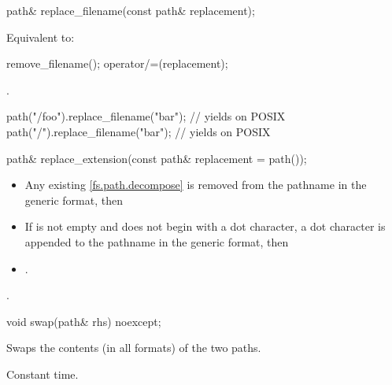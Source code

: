 %
\begin{itemdecl}
path& replace_filename(const path& replacement);
\end{itemdecl}

\begin{itemdescr}
\pnum
\effects
Equivalent to:
\begin{codeblock}
remove_filename();
operator/=(replacement);
\end{codeblock}

\pnum
\returns
{}.

\pnum
\begin{example}
\begin{codeblock}
path("/foo").replace_filename("bar");   // yields  on POSIX
path("/").replace_filename("bar");      // yields  on POSIX
\end{codeblock}
\end{example}
\end{itemdescr}

%
\begin{itemdecl}
path& replace_extension(const path& replacement = path());
\end{itemdecl}

\begin{itemdescr}
\pnum
\effects
  \begin{itemize}
\item Any existing \ref{fs.path.decompose}\tcode{)} is removed from the
    pathname in the generic format,
    then
\item If  is not empty and does not begin with a dot
    character, a dot character is appended to the pathname in the generic format, then
\item
  .
  \end{itemize}

\pnum
\returns
{}.
\end{itemdescr}

%
\begin{itemdecl}
void swap(path& rhs) noexcept;
\end{itemdecl}

\begin{itemdescr}
\pnum
\effects
Swaps the contents (in all formats) of the two paths.

\pnum
\complexity
Constant time.
\end{itemdescr}

